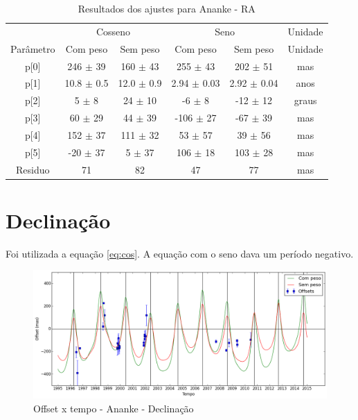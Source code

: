 \documentclass[11pt,a4paper]{report}
\begin{document}
\begin{table}[h!]
\caption{\label{Tab: Ananke-RA} Resultados dos ajustes para Ananke - RA}
\begin{centering}
\begin{tabular}{cccccc}
\hline
\hline
 & \multicolumn{2}{c}{Cosseno} & \multicolumn{2}{c}{Seno} & Unidade\tabularnewline
Parâmetro & Com peso & Sem peso & Com peso & Sem peso & Unidade\tabularnewline
\hline
p[0] & 246 $\pm$ 39 & 160 $\pm$ 43 & 255 $\pm$ 43 & 202 $\pm$ 51 & mas\\
p[1] & 10.8 $\pm$ 0.5 & 12.0 $\pm$ 0.9 & 2.94 $\pm$ 0.03 & 2.92 $\pm$ 0.04 & anos\\
p[2] & 5 $\pm$ 8 & 24 $\pm$ 10 & -6 $\pm$ 8 & -12 $\pm$ 12 & graus\\
p[3] & 60 $\pm$ 29 & 44 $\pm$ 39 & -106 $\pm$ 27 & -67 $\pm$ 39 & mas\\
p[4] & 152 $\pm$ 37 & 111 $\pm$ 32 & 53 $\pm$ 57 & 39 $\pm$ 56 & mas\\
p[5] & -20 $\pm$ 37 & 5 $\pm$ 37 & 106 $\pm$ 18 &  103 $\pm$ 28 & mas\\
Residuo & 71 & 82 & 47 & 77 & mas\\
\hline 
\end{tabular} 
\par\end{centering}
\end{table}

\section*{Declinação}

Foi utilizada a equação \ref{eq:cos}. A equação com o seno dava um período negativo.

\begin{figure}[h]
\caption{Offset x tempo - Ananke - Declinação}
\includegraphics[scale=0.45]{Ananke/DEC.png}
\end{figure}
\end{document}
